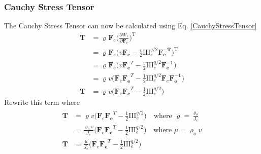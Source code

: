 \documentclass[12pt,3p]{article}
\numberwithin{equation}{section}
\begin{document}
\subsubsection{Cauchy Stress Tensor}
The Cauchy Stress Tensor can now be calculated using Eq. \ref{CauchyStressTensor}
\begin{align*}
\mathbf{T} &= \varrho \mathbf{F}_{e} \bigg( \frac{\partial W_{e}}{\partial \mathbf{F}_{e}} \bigg)^{\mathrm{T}} \\
		 &= \varrho \mathbf{F}_{e} \big( v \mathbf{F_e} - \frac{v}{2} \mathrm{III}_e^{q/2} \mathbf{F_e^{-T}} \big)^{\mathrm{T}} \\
		 &= \varrho \mathbf{F}_{e} \big( v \mathbf{F_e}^T - \frac{v}{2} \mathrm{III}_e^{q/2} \mathbf{F_e^{-1}} \big) \\
		 &= \varrho v \big( \mathbf{F}_{e} \mathbf{F_e}^T - \frac{1}{2} \mathrm{III}_e^{q/2} \mathbf{F}_{e} \mathbf{F_e^{-1}} \big) \\
\mathbf{T} &= \varrho v \big( \mathbf{F}_{e} \mathbf{F_e}^T - \frac{1}{2} \mathrm{III}_e^{q/2} \big) 
\end{align*}
Rewrite this term where 
\begin{align}\label{CauchyStressBK}
\begin{split}
\mathbf{T} &= \varrho v \big( \mathbf{F}_{e} \mathbf{F_e}^T - \frac{1}{2} \mathrm{III}_e^{q/2} \big) \quad \text{where } \varrho = \frac{\varrho_o}{J_e}\\
		 &= \frac{\varrho_o v}{J_e} \big( \mathbf{F}_{e} \mathbf{F_e}^T - \frac{1}{2} \mathrm{III}_e^{q/2} \big) \quad \text{where } \mu = \varrho_o v \\
\mathbf{T} &= \frac{\mu}{J_e} \big( \mathbf{F}_{e} \mathbf{F_e}^T - \frac{1}{2} \mathrm{III}_e^{q/2} \big) 
\end{split}
\end{align}

\end{document}
